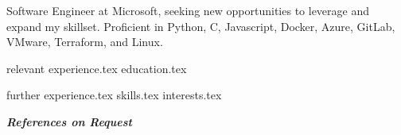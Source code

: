 \documentclass[letterpaper,12pt]{article}
\begin{document}
\thispagestyle{empty}

\vspace{0.8cm} 

Software Engineer at Microsoft, seeking new opportunities to leverage and expand my skillset. Proficient in Python, C, Javascript, Docker, Azure, GitLab, VMware, Terraform, and Linux.


{relevant experience.tex}
{education.tex}


{further experience.tex}
{skills.tex}
{interests.tex}
\thispagestyle{empty}

\vspace*{\fill}
\centering
\textit{\textbf{References on Request}}
\end{document}
